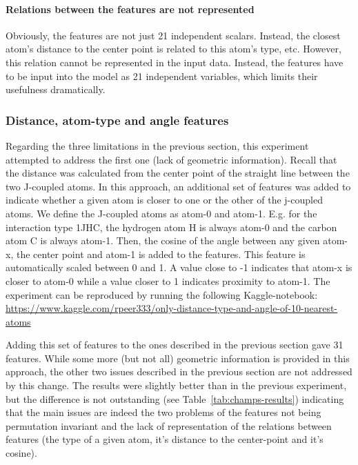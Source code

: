 \paragraph*{Relations between the features are not represented} Obviously, the features are not just 21 independent scalars. Instead, the closest atom's distance to the center point is related to this atom's type, etc. However, this relation cannot be represented in the input data. Instead, the features have to be input into the model as 21 independent variables, which limits their usefulness dramatically.


\subsubsection{Distance, atom-type and angle features}
\label{sec:dist-angle-atom-type}

Regarding the three limitations in the previous section, this experiment attempted to address the first one (lack of geometric information). Recall that the distance was calculated from the center point of the straight line between the two J-coupled atoms. In this approach, an additional set of features was added to indicate whether a given atom is closer to one or the other of the j-coupled atoms. We define the J-coupled atoms as atom-0 and atom-1. E.g. for the interaction type 1JHC, the hydrogen atom H is always atom-0 and the carbon atom C is always atom-1. Then, the cosine of the angle between any given atom-x, the center point and atom-1 is added to the features. This feature is automatically scaled between 0 and 1. A value close to -1 indicates that atom-x is closer to atom-0 while a value closer to 1 indicates proximity to atom-1. The experiment can be reproduced by running the following Kaggle-notebook:~ \url{https://www.kaggle.com/rpeer333/only-distance-type-and-angle-of-10-nearest-atoms}

Adding this set of features to the ones described in the previous section gave 31 features. While some more (but not all) geometric information is provided in this approach, the other two issues described in the previous section are not addressed by this change. The results were slightly better than in the previous experiment, but the difference is not outstanding (see Table~\ref{tab:champs-results}) indicating that the main issues are indeed the two problems of the features not being permutation invariant and the lack of representation of the relations between features (the type of a given atom, it's distance to the center-point and it's cosine).


